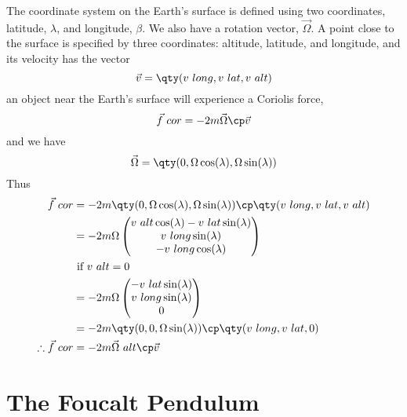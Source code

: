 The coordinate system on the Earth's surface is defined using two
coordinates, latitude, $\lambda$, and longitude, $\beta$. We also have
a rotation vector, $\vec{\Omega}$. A point close to the surface is
specified by three coordinates: altitude, latitude, and longitude, and
its velocity has the vector 
\[ \vec{v} = \qty( v~{long}, v~{lat}, v~{alt}) \]
an object near the Earth's surface will experience a Coriolis force,
\[ \vec{f}~{cor} = - 2m \vec{\Omega} \cp \vec{v} \]
and we have
\[ \vec{\Omega} = \qty( 0, \Omega \cos(\lambda), \Omega \sin(\lambda) ) \]
Thus
\begin{align} 
\vec{f}~{cor} &= -2m  \qty( 0, \Omega \cos(\lambda), \Omega \sin(\lambda) ) \cp \qty( v~{long}, v~{lat}, v~{alt}) \nonumber\\
&= - 2 m \Omega \begin{pmatrix} v~{alt} \cos(\lambda) - v~{lat} \sin(\lambda)\\ v~{long} \sin(\lambda) \\ - v~{long} \cos(\lambda)
\end{pmatrix} \nonumber \\
& \text{ if } v~{alt} = 0 \nonumber \\
&= -2m \Omega
\begin{pmatrix}
  - v~{lat} \sin(\lambda) \\ v~{long} \sin(\lambda) \\ 0 
\end{pmatrix} \nonumber \\
&= - 2m \qty(0 , 0 , \Omega \sin(\lambda) ) \cp \qty( v~{long}, v~{lat}, 0) \nonumber \\
\therefore \vec{f}~{cor} &= - 2 m \vec{\Omega}~{alt} \cp \vec{v}
\end{align}

\section{The Foucalt Pendulum}
\label{sec:foucalt-pendulum}

